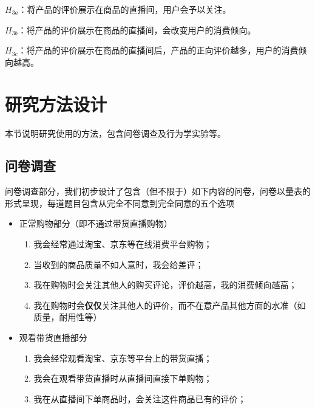 \documentclass{../notes}
\begin{document}
    \begin{hypothesis}
        $H_{3a}$：将产品的评价展示在商品的直播间，用户会予以关注。
        \label{hyp:3a}
    \end{hypothesis}
    \begin{hypothesis}
        $H_{3b}$：将产品的评价展示在商品的直播间，会改变用户的消费倾向。
        \label{hyp:3b}
    \end{hypothesis}
    \begin{hypothesis}
        $H_{3c}$：将产品的评价展示在商品的直播间后，产品的正向评价越多，用户的消费倾向越高。
        \label{hyp:3c}
    \end{hypothesis}

    \section{研究方法设计}

    本节说明研究使用的方法，包含问卷调查及行为学实验等。

    \subsection{问卷调查}

    问卷调查部分，我们初步设计了包含（但不限于）如下内容的问卷，问卷以量表的形式呈现，每道题目包含从完全不同意到完全同意的五个选项

    \begin{itemize}
        \item 正常购物部分（即不通过带货直播购物）
        \begin{enumerate}
            \item 我会经常通过淘宝、京东等在线消费平台购物；
            \item 当收到的商品质量不如人意时，我会给差评；
            \item 我在购物时会关注其他人的购买评论，评价越高，我的消费倾向越高；
            \item 我在购物时会\textbf{仅仅}关注其他人的评价，而不在意产品其他方面的水准（如质量，耐用性等）
        \end{enumerate}
        \item 观看带货直播部分
        \begin{enumerate}
            \item 我会经常观看淘宝、京东等平台上的带货直播；
            \item 我会在观看带货直播时从直播间直接下单购物；
            \item 我在从直播间下单商品时，会关注这件商品已有的评价；
        \end{enumerate}
    \end{itemize}
\end{document}
